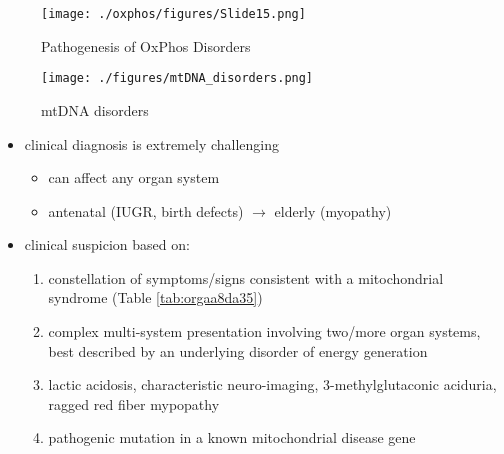 \documentclass{scrartcl}
\begin{document}
\begin{figure}[htbp]
\centering
\texttt{[image: ./oxphos/figures/Slide15.png]}
\caption[ETC]{\label{fig:org459d14c}
Pathogenesis of OxPhos Disorders}
\end{figure}


\begin{figure}[htbp]
\centering
\texttt{[image: ./figures/mtDNA\_disorders.png]}
\caption{\label{fig:org0d66aec}
mtDNA disorders}
\end{figure}


\begin{itemize}
\item clinical diagnosis is extremely challenging
\begin{itemize}
\item can affect any organ system
\item antenatal (IUGR, birth defects) \(\to\) elderly (myopathy)
\end{itemize}

\item clinical suspicion based on:
\begin{enumerate}
\item constellation of symptoms/signs consistent with a mitochondrial syndrome (Table \ref{tab:orgaa8da35})
\item complex multi-system presentation involving two/more organ systems,
best described by an underlying disorder of energy generation
\item lactic acidosis, characteristic neuro-imaging, 3-methylglutaconic
aciduria, ragged red fiber mypopathy
\item pathogenic mutation in a known mitochondrial disease gene
\end{enumerate}
\end{itemize}
\end{document}
